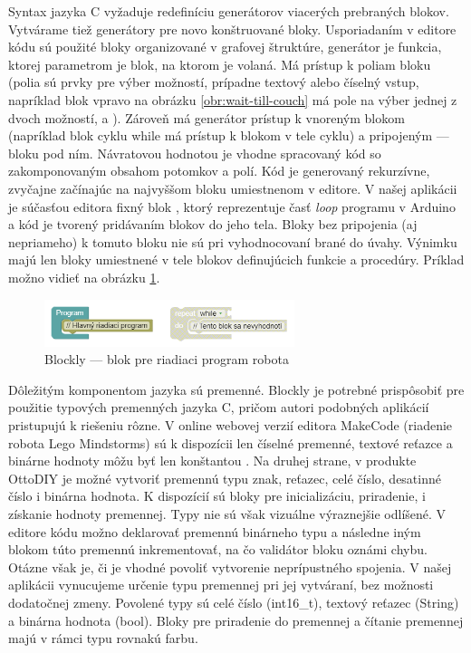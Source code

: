 Syntax jazyka C vyžaduje redefiníciu generátorov viacerých prebraných blokov. Vytvárame tiež generátory pre novo konštruované bloky. Usporiadaním v editore kódu sú použité bloky organizované v grafovej štruktúre, generátor je funkcia, ktorej parametrom je blok, na ktorom je volaná. Má prístup k poliam bloku (polia sú prvky pre výber možností, prípadne textový alebo číselný vstup, napríklad blok vpravo na obrázku \ref{obr:wait-till-couch} má pole na výber jednej z dvoch možností,  a ). Zároveň má generátor prístup k vnoreným blokom (napríklad blok cyklu while má prístup k blokom v tele cyklu) a pripojeným  --- bloku pod ním. Návratovou hodnotou je vhodne spracovaný kód so zakomponovaným obsahom potomkov a polí. Kód je generovaný rekurzívne, zvyčajne začínajúc na najvyššom bloku umiestnenom v editore. V našej aplikácii je súčasťou editora fixný blok , ktorý reprezentuje časť \textit{loop} programu v Arduino a kód je tvorený pridávaním blokov do jeho tela. Bloky bez pripojenia (aj nepriameho) k tomuto bloku nie sú pri vyhodnocovaní brané do úvahy. Výnimku majú len bloky umiestnené v tele blokov definujúcich funkcie a procedúry. Príklad možno vidieť na obrázku \ref{obr:disabled-orphan-block}.

\begin{figure}
\centerline{\includegraphics[width=0.65\textwidth]{images/disabled-orphan-block}}
\caption[Blockly --- blok pre riadiaci program robota]{Blockly --- blok pre riadiaci program robota}
\label{obr:disabled-orphan-block}
\end{figure}

Dôležitým komponentom jazyka sú premenné. Blockly je potrebné prispôsobiť pre použitie typových premenných jazyka C, pričom autori podobných aplikácií pristupujú k riešeniu rôzne. V online webovej verzií editora MakeCode (riadenie robota Lego Mindstorms) sú k dispozícii len číselné premenné, textové reťazce a binárne hodnoty môžu byť len konštantou \cite{makeCodeWebEditor}. Na druhej strane, v produkte OttoDIY je možné vytvoriť premennú typu znak, reťazec, celé číslo, desatinné číslo i binárna hodnota. K dispozícií sú bloky pre inicializáciu, priradenie, i získanie hodnoty premennej. Typy nie sú však vizuálne výraznejšie odlíšené. V editore kódu možno deklarovať premennú binárneho typu a následne iným blokom túto premennú inkrementovať, na čo validátor bloku oznámi chybu. Otázne však je, či je vhodné povoliť vytvorenie neprípustného spojenia. V našej aplikácii vynucujeme určenie typu premennej pri jej vytváraní, bez možnosti dodatočnej zmeny. Povolené typy sú celé číslo (int16\_t), textový reťazec (String) a binárna hodnota (bool). Bloky pre priradenie do premennej a čítanie premennej majú v rámci typu rovnakú farbu.



